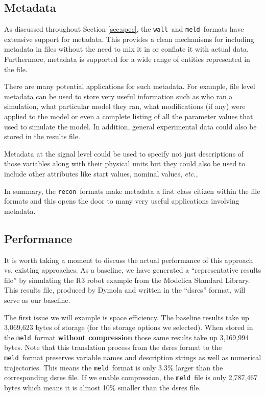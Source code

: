 \documentclass[11pt,a4paper,twocolumn]{article}
\newcommand{\recon}{\texttt{recon}}
\newcommand{\wall}{\texttt{wall}}
\newcommand{\meld}{\texttt{meld}}
\begin{document}
\subsection{Metadata}


As discussed throughout Section \ref{sec:spec}, the \wall\ and
\meld\ formats have extensive support for metadata.  This provides a
clean mechanisms for including metadata in files without the need to
mix it in or conflate it with actual data.  Furthermore, metadata is
supported for a wide range of entities represented in the file.

There are many potential applications for such metadata.  For example,
file level metadata can be used to store very useful information such
as who ran a simulation, what particular model they ran, what
modifications (if any) were applied to the model or even a complete
listing of all the parameter values that used to simulate the model.
In addition, general experimental data could also be stored in the
results file.

Metadata at the signal level could be used to specify not just
descriptions of those variables along with their physical units but
they could also be used to include other attributes like start values,
nominal values, \textit{etc.},

In summary, the \recon\ formats make metadata a first class citizen
within the file formats and this opens the door to many very useful
applications involving metadata.


\subsection{Performance}

It is worth taking a moment to discuss the actual performance of this
approach vs. existing approaches.  As a baseline, we have generated a
``representative results file'' by simulating the R3 robot example
from the Modelica Standard Library.  This results file, produced by
Dymola and written in the ``dsres'' format, will serve as our
baseline.


The first issue we will example is space efficiency.  The baseline
results take up 3,069,623 bytes of storage (for the storage options we
selected).  When stored in the \meld\ format \textbf{without compression}
those same results take up 3,169,994 bytes.  Note that this
translation process from the dsres format to the \meld\ format
preserves variable names and description strings as well as numerical
trajectories.  This means the \meld\ format is only 3.3\% larger than
the corresponding dsres file.  If we enable compression, the
\meld\ file is only 2,787,467 bytes which means it is almost 10\%
smaller than the dsres file.
\end{document}

